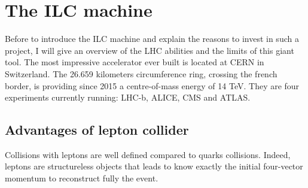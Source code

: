 



  
  
   
  \section{The ILC machine}
 
  Before to introduce the ILC machine and explain the reasons to invest in such a project, I will give an overview of the LHC abilities and the limits of this giant tool.
  The most impressive accelerator ever built is located at CERN in Switzerland. 
  The 26.659 kilometers circumference ring, crossing the french border, is providing since 2015 a centre-of-mass energy of 14 TeV.
  They are four experiments currently running: LHC-b, ALICE, CMS and ATLAS.
   
    \subsection{Advantages of lepton collider}

    Collisions with leptons are well defined compared to quarks collisions. 
    Indeed, leptons are structureless objects that leads to know exactly the initial four-vector momentum to reconstruct fully the event.
    
    \subsection{}
  

